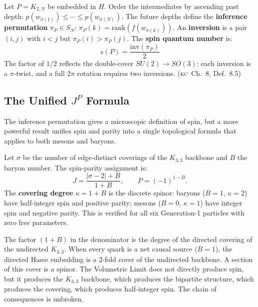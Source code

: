 \documentclass[11pt, a4paper, openany]{book}
\newcommand{\KC}[1]{\textnormal{(\textsc{kc}~#1)}}
\newcounter{thm}[chapter]
\begin{document}
\begin{definition}\label{def:causal-spin}
Let $P = K_{2,N}$ be embedded in $H$. Order the intermediates by ascending past depth: $p(w_{\sigma(1)}) \le \cdots \le p(w_{\sigma(N)})$. The future depths define the \textbf{inference permutation} $\pi_P \in S_N$: $\pi_P(k) = \mathrm{rank}(f(w_{\sigma(k)}))$. An \textbf{inversion} is a pair $(i,j)$ with $i < j$ but $\pi_P(i) > \pi_P(j)$. The \textbf{spin quantum number} is:
\[
  s(P) = \frac{\mathrm{inv}(\pi_P)}{2}
\]
The factor of $1/2$ reflects the double-cover $SU(2) \to SO(3)$: each inversion is a $\pi$-twist, and a full $2\pi$ rotation requires two inversions. \KC{Ch.~8, Def.~8.5}
\end{definition}

\subsection{The Unified $J^P$ Formula}

The inference permutation gives a microscopic definition of spin, but a
more powerful result unifies spin and parity into a single topological
formula that applies to both mesons and baryons.

\begin{theorem}\label{thm:unified-JP}
Let $\sigma$ be the number of edge-distinct coverings of the $K_{3,3}$
backbone and $B$ the baryon number. The spin-parity assignment is:
\[
  J = \frac{|\sigma - 2| + B}{1 + B}, \qquad
  P = (-1)^{1-B}.
\]
The \textbf{covering degree} $\kappa = 1 + B$ is the discrete spinor:
baryons ($B = 1$, $\kappa = 2$) have half-integer spin and positive
parity; mesons ($B = 0$, $\kappa = 1$) have integer spin and negative
parity. This is verified for all six Generation-1 particles with zero
free parameters.
\end{theorem}

\noindent
The factor $(1 + B)$ in the denominator is the degree of the directed
covering of the undirected $K_{3,3}$. When every quark is a net causal
source ($B = 1$), the directed Hasse embedding is a 2-fold cover of the
undirected backbone. A section of this cover is a spinor. The Volumetric
Limit does not directly produce spin, but it produces the $K_{3,3}$
backbone, which produces the bipartite structure, which produces the
covering, which produces half-integer spin. The chain of consequences
is unbroken.
\end{document}
